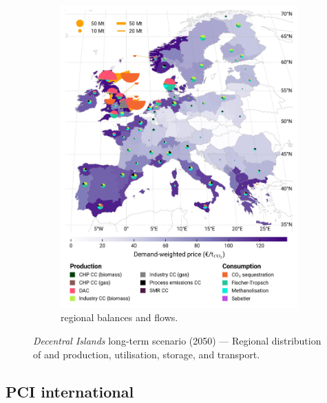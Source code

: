 \documentclass[preprint,12pt,sort&compress]{elsarticle}
\begin{document}
\begin{figure}[htbp]
\begin{subfigure}[t]{0.49\textwidth}
      \includegraphics[width=1\textwidth]{maps/no-pipelines-no-pcipmi/base_s_adm___2050-balance_map_co2_stored} 
      \vspace{-0.7cm}
      \caption{ regional balances and flows.}
      \label{fig:DI_lt_2050_co2}
  \end{subfigure}
  \caption{\textit{Decentral Islands} long-term scenario (2050) --- Regional distribution of  and  production, utilisation, storage, and transport.}
  \label{fig:DI_lt_2050}
\end{figure}

\clearpage

\subsection{PCI international}
\end{document}
